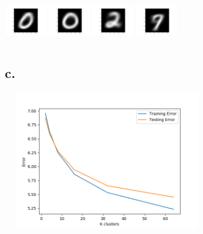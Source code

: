 \documentclass{article}
\begin{document}
\includegraphics[width=1.8cm, height=2cm]{plots/A4/A4b_6.png}
\includegraphics[width=1.8cm, height=2cm]{plots/A4/A4b_7.png}
\includegraphics[width=1.8cm, height=2cm]{plots/A4/A4b_8.png}
\includegraphics[width=1.8cm, height=2cm]{plots/A4/A4b_9.png}


\subsection*{c.}
\includegraphics[width=9cm, height=6cm]{plots/A4/A4c.png} \newline
\end{document}
